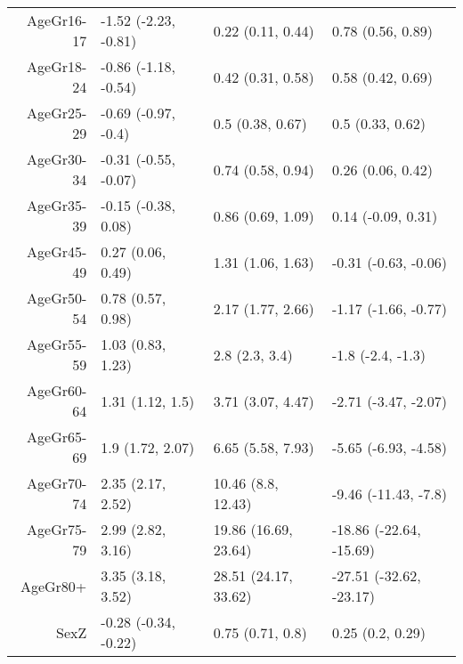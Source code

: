 \begin{table}[ht]
\begin{tabular}{rlll}
  AgeGr16-17 & -1.52 (-2.23, -0.81) & 0.22 (0.11, 0.44) & 0.78 (0.56, 0.89) \\ 
  AgeGr18-24 & -0.86 (-1.18, -0.54) & 0.42 (0.31, 0.58) & 0.58 (0.42, 0.69) \\ 
  AgeGr25-29 & -0.69 (-0.97, -0.4) & 0.5 (0.38, 0.67) & 0.5 (0.33, 0.62) \\ 
  AgeGr30-34 & -0.31 (-0.55, -0.07) & 0.74 (0.58, 0.94) & 0.26 (0.06, 0.42) \\ 
  AgeGr35-39 & -0.15 (-0.38, 0.08) & 0.86 (0.69, 1.09) & 0.14 (-0.09, 0.31) \\ 
  AgeGr45-49 & 0.27 (0.06, 0.49) & 1.31 (1.06, 1.63) & -0.31 (-0.63, -0.06) \\ 
  AgeGr50-54 & 0.78 (0.57, 0.98) & 2.17 (1.77, 2.66) & -1.17 (-1.66, -0.77) \\ 
  AgeGr55-59 & 1.03 (0.83, 1.23) & 2.8 (2.3, 3.4) & -1.8 (-2.4, -1.3) \\ 
  AgeGr60-64 & 1.31 (1.12, 1.5) & 3.71 (3.07, 4.47) & -2.71 (-3.47, -2.07) \\ 
  AgeGr65-69 & 1.9 (1.72, 2.07) & 6.65 (5.58, 7.93) & -5.65 (-6.93, -4.58) \\ 
  AgeGr70-74 & 2.35 (2.17, 2.52) & 10.46 (8.8, 12.43) & -9.46 (-11.43, -7.8) \\ 
  AgeGr75-79 & 2.99 (2.82, 3.16) & 19.86 (16.69, 23.64) & -18.86 (-22.64, -15.69) \\ 
  AgeGr80+ & 3.35 (3.18, 3.52) & 28.51 (24.17, 33.62) & -27.51 (-32.62, -23.17) \\ 
  SexZ & -0.28 (-0.34, -0.22) & 0.75 (0.71, 0.8) & 0.25 (0.2, 0.29) \\ 
   \hline
\end{tabular}
\end{table}
